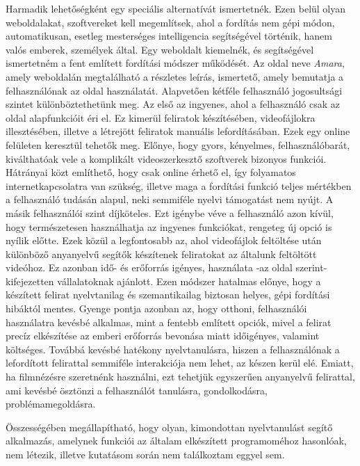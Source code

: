 Harmadik lehetőségként egy speciális alternatívát ismertetnék. Ezen belül olyan weboldalakat, szoftvereket kell megemlítsek, ahol a fordítás nem gépi módon, automatikusan, esetleg mesterséges intelligencia segítségével történik, hanem valós emberek, személyek által. Egy weboldalt kiemelnék,  és segítségével ismertetném a fent említett fordítási módszer működését. Az oldal neve \textit{Amara}, amely weboldalán megtalálható a részletes leírás, ismertető, amely bemutatja a felhasználónak az oldal használatát. Alapvetően kétféle felhasználó jogosultsági szintet különböztethetünk meg. Az első az ingyenes, ahol a felhasználó csak az oldal alapfunkcióit éri el. Ez kimerül feliratok készítésében, videofájlokra illesztésében, illetve a létrejött feliratok manuális lefordításában. Ezek egy online felületen keresztül tehetők meg. Előnye, hogy gyors, kényelmes, felhasználóbarát, kiválthatóak vele a komplikált videoszerkesztő szoftverek bizonyos funkciói. Hátrányai közt említhető, hogy csak online érhető el, így folyamatos internetkapcsolatra van szükség, illetve maga a fordítási funkció teljes mértékben a felhasználó tudásán alapul, neki semmiféle nyelvi támogatást nem nyújt. A másik felhasználói szint díjköteles. Ezt igénybe véve a felhasználó azon kívül, hogy természetesen használhatja az ingyenes funkciókat, rengeteg új opció is nyílik előtte. Ezek közül a legfontosabb az, ahol videofájlok feltöltése után különböző anyanyelvű segítők készítenek feliratokat az általunk feltöltött videóhoz. Ez azonban idő- és erőforrás igényes, használata -az oldal szerint- kifejezetten vállalatoknak ajánlott. Ezen módszer hatalmas előnye, hogy a készített felirat nyelvtanilag és szemantikailag biztosan helyes, gépi fordítási hibáktól mentes. Gyenge pontja azonban az, hogy otthoni, felhasználói használatra kevésbé alkalmas, mint a fentebb említett opciók, mivel a felirat precíz elkészítése az emberi erőforrás bevonása miatt időigényes, valamint költséges. Továbbá kevésbé hatékony nyelvtanulásra, hiszen a felhasználónak a lefordított felirattal semmiféle interakciója nem lehet, az készen kerül elé. Emiatt, ha filmnézésre szeretnénk használni, ezt tehetjük egyszerűen anyanyelvű felirattal, ami kevésbé ösztönzi a felhasználót tanulásra, gondolkodásra, problémamegoldásra.

Összességében megállapítható, hogy olyan, kimondottan nyelvtanulást segítő alkalmazás, amelynek funkciói az általam elkészített programoméhoz hasonlóak, nem létezik, illetve kutatásom során nem találkoztam eggyel sem.